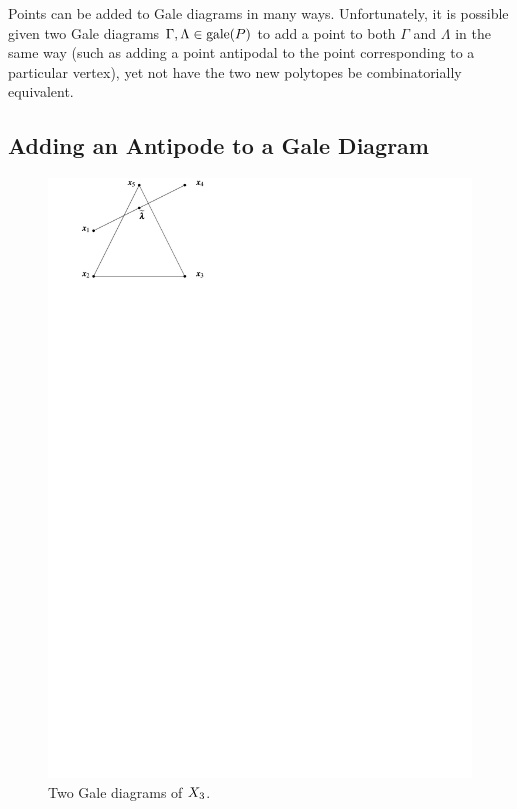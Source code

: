     Points can be added to Gale diagrams in many ways.  Unfortunately, it is possible given two Gale diagrams  \(\Gamma,\Lambda\in\operatorname{gale}(P)\) to add a point to both \(\Gamma\) and \(\Lambda\) in the same way (such as adding a point antipodal to the point corresponding to a particular vertex), yet not have the two new polytopes be combinatorially equivalent.

    \subsection{Adding an Antipode to a Gale Diagram}
        \begin{figure}[p!hbt]
            \centering
                \includegraphics[width=.7\textwidth, page=16]{pictures.pdf}
            \caption{Two Gale diagrams of $X_{3}$.\label{Fig:2GaleDXp3}}
        \end{figure}

